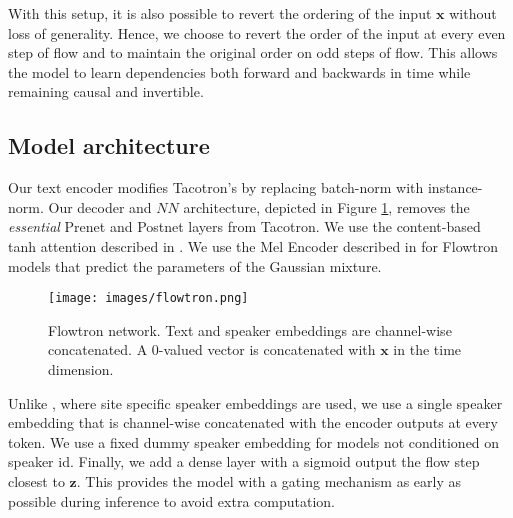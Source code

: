 \documentclass{article}
\begin{document}
With this setup, it is also possible to revert the ordering of the input $\boldsymbol{x}$ without loss of generality. Hence, we choose to revert the order of the input at every even step of flow and to maintain the original order on odd steps of flow. This allows the model to learn dependencies both forward and backwards in time while remaining causal and invertible.

\subsection{Model architecture}
Our text encoder modifies Tacotron's by replacing batch-norm with instance-norm. Our decoder and $NN$ architecture, depicted in Figure \ref{fig:Flowtron}, removes the \textit{essential} Prenet and Postnet layers from Tacotron. We use the content-based tanh attention described in \cite{vinyals2015grammar}. We use the Mel Encoder described in \cite{hsu2018hierarchical} for Flowtron models that predict the parameters of the Gaussian mixture.

\begin{figure}[!ht]
    \centering
    \texttt{[image: images/flowtron.png]}
    \caption{Flowtron network. Text and speaker embeddings are channel-wise concatenated. A 0-valued vector is concatenated with $\boldsymbol{x}$ in the time dimension.}
    \label{fig:Flowtron}
\end{figure}

Unlike \cite{ping2017deep,gibiansky2017deep}, where site specific speaker embeddings are used, we use a single speaker embedding that is channel-wise concatenated with the encoder outputs at every token. We use a fixed dummy speaker embedding for models not conditioned on speaker id. Finally, we add a dense layer with a sigmoid output the flow step closest to $\boldsymbol{z}$. This provides the model with a gating mechanism as early as possible during inference to avoid extra computation.
\end{document}
